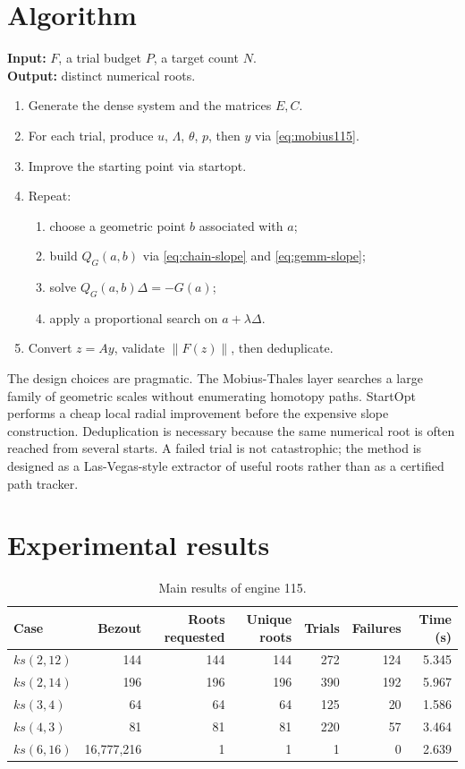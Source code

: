 \documentclass[11pt,a4paper]{article}
\begin{document}
\section{Algorithm}
\noindent\textbf{Input:} \(F\), a trial budget \(P\), a target count \(N\).\\
\textbf{Output:} distinct numerical roots.
\begin{enumerate}
  \item Generate the dense system and the matrices \(E,C\).
  \item For each trial, produce \(u\), \(\Lambda\), \(\theta\), \(p\), then \(y\) via \eqref{eq:mobius115}.
  \item Improve the starting point via startopt.
  \item Repeat:
  \begin{enumerate}
    \item choose a geometric point \(b\) associated with \(a\);
    \item build \(Q_G(a,b)\) via \eqref{eq:chain-slope} and \eqref{eq:gemm-slope};
    \item solve \(Q_G(a,b)\Delta=-G(a)\);
    \item apply a proportional search on \(a+\lambda\Delta\).
  \end{enumerate}
  \item Convert \(z=Ay\), validate \(\|F(z)\|\), then deduplicate.
\end{enumerate}
The design choices are pragmatic. The Mobius-Thales layer searches a large family of geometric scales without enumerating homotopy paths. StartOpt performs a cheap local radial improvement before the expensive slope construction. Deduplication is necessary because the same numerical root is often reached from several starts. A failed trial is not catastrophic; the method is designed as a Las-Vegas-style extractor of useful roots rather than as a certified path tracker.

\section{Experimental results}
\begin{table}[h]
\centering
\begin{tabular}{lrrrrrr}
\toprule
Case & Bezout & Roots requested & Unique roots & Trials & Failures & Time (s)\\
\midrule
\(ks(2,12)\) & 144 & 144 & 144 & 272 & 124 & 5.345\\
\(ks(2,14)\) & 196 & 196 & 196 & 390 & 192 & 5.967\\
\(ks(3,4)\) & 64 & 64 & 64 & 125 & 20 & 1.586\\
\(ks(4,3)\) & 81 & 81 & 81 & 220 & 57 & 3.464\\
\(ks(6,16)\) & 16,777,216 & 1 & 1 & 1 & 0 & 2.639\\
\bottomrule
\end{tabular}
\caption{Main results of engine 115.}
\label{tab:115-main}
\end{table}
\end{document}
